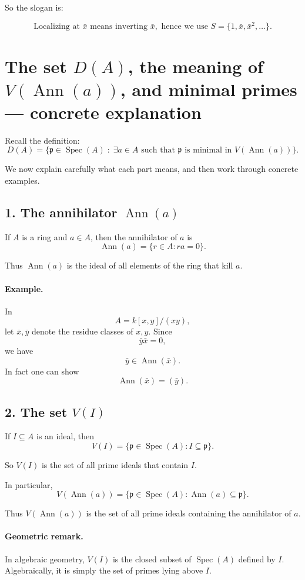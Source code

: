 \documentclass[12pt,a4paper]{article}
\theoremstyle{notespace}
\DeclareMathOperator{\Spec}{Spec}
\DeclareMathOperator{\Ann}{Ann}
\begin{document}
So the slogan is:

\[
\boxed{\text{Localizing at }\bar x\text{ means inverting }\bar x,\text{ hence we use }
	S=\{1,\bar x,\bar x^2,\dots\}.}
\]	
	
	
\section{The set \(D(A)\), the meaning of \(V(\Ann(a))\), and minimal primes --- concrete explanation}

Recall the definition:
\[
D(A)=\{\mathfrak p\in \Spec(A)\;:\;\exists a\in A \text{ such that }
\mathfrak p \text{ is minimal in } V(\Ann(a))\}.
\]

We now explain carefully what each part means, and then work through concrete examples.

\subsection{1. The annihilator \(\Ann(a)\)}

If \(A\) is a ring and \(a\in A\), then the annihilator of \(a\) is
\[
\Ann(a)=\{r\in A : ra=0\}.
\]

Thus \(\Ann(a)\) is the ideal of all elements of the ring that kill \(a\).

\paragraph{Example.}
In
\[
A=k[x,y]/(xy),
\]
let \(\bar x,\bar y\) denote the residue classes of \(x,y\). Since
\[
\bar y\bar x=0,
\]
we have
\[
\bar y\in \Ann(\bar x).
\]
In fact one can show
\[
\Ann(\bar x)=(\bar y).
\]

\subsection{2. The set \(V(I)\)}

If \(I\subseteq A\) is an ideal, then
\[
V(I)=\{\mathfrak p\in \Spec(A): I\subseteq \mathfrak p\}.
\]

So \(V(I)\) is the set of all prime ideals that contain \(I\).

In particular,
\[
V(\Ann(a))=\{\mathfrak p\in \Spec(A): \Ann(a)\subseteq \mathfrak p\}.
\]

Thus \(V(\Ann(a))\) is the set of all prime ideals containing the annihilator of \(a\).

\paragraph{Geometric remark.}
In algebraic geometry, \(V(I)\) is the closed subset of \(\Spec(A)\) defined by \(I\). Algebraically, it is simply the set of primes lying above \(I\).
\end{document}
